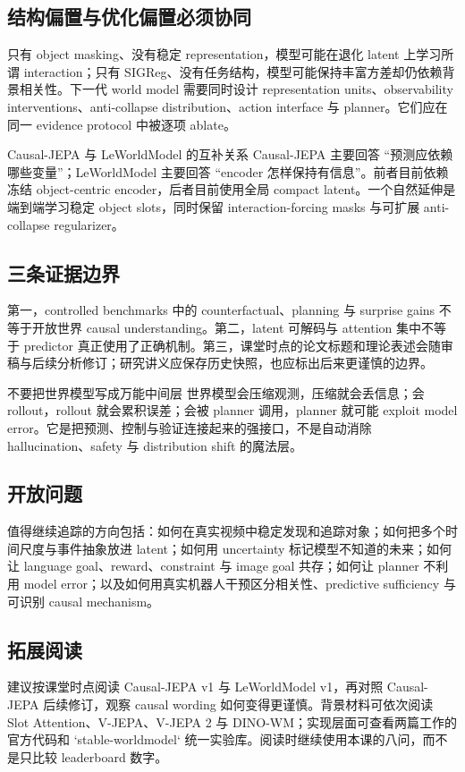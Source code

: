 \documentclass[a4paper]{article}
\begin{document}
\subsection{结构偏置与优化偏置必须协同}

只有 object masking、没有稳定 representation，模型可能在退化 latent 上学习所谓 interaction；只有 SIGReg、没有任务结构，模型可能保持丰富方差却仍依赖背景相关性。下一代 world model 需要同时设计 representation units、observability interventions、anti-collapse distribution、action interface 与 planner。它们应在同一 evidence protocol 中被逐项 ablate。

\begin{knowledgebox}{Causal-JEPA 与 LeWorldModel 的互补关系}
Causal-JEPA 主要回答 ``预测应依赖哪些变量''；LeWorldModel 主要回答 ``encoder 怎样保持有信息''。前者目前依赖冻结 object-centric encoder，后者目前使用全局 compact latent。一个自然延伸是端到端学习稳定 object slots，同时保留 interaction-forcing masks 与可扩展 anti-collapse regularizer。
\end{knowledgebox}

\subsection{三条证据边界}

第一，controlled benchmarks 中的 counterfactual、planning 与 surprise gains 不等于开放世界 causal understanding。第二，latent 可解码与 attention 集中不等于 predictor 真正使用了正确机制。第三，课堂时点的论文标题和理论表述会随审稿与后续分析修订；研究讲义应保存历史快照，也应标出后来更谨慎的边界。

\begin{warningbox}{不要把世界模型写成万能中间层}
世界模型会压缩观测，压缩就会丢信息；会 rollout，rollout 就会累积误差；会被 planner 调用，planner 就可能 exploit model error。它是把预测、控制与验证连接起来的强接口，不是自动消除 hallucination、safety 与 distribution shift 的魔法层。
\end{warningbox}

\subsection{开放问题}

值得继续追踪的方向包括：如何在真实视频中稳定发现和追踪对象；如何把多个时间尺度与事件抽象放进 latent；如何用 uncertainty 标记模型不知道的未来；如何让 language goal、reward、constraint 与 image goal 共存；如何让 planner 不利用 model error；以及如何用真实机器人干预区分相关性、predictive sufficiency 与可识别 causal mechanism。

\subsection{拓展阅读}

建议按课堂时点阅读 Causal-JEPA v1 与 LeWorldModel v1，再对照 Causal-JEPA 后续修订，观察 causal wording 如何变得更谨慎。背景材料可依次阅读 Slot Attention、V-JEPA、V-JEPA 2 与 DINO-WM；实现层面可查看两篇工作的官方代码和 `stable-worldmodel` 统一实验库。阅读时继续使用本课的八问，而不是只比较 leaderboard 数字。
\end{document}
